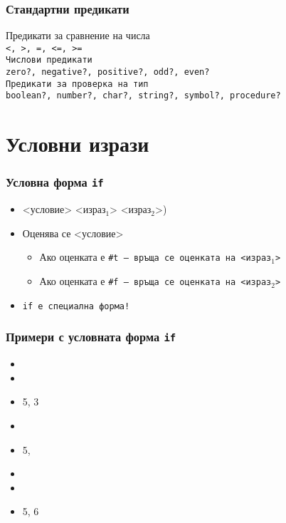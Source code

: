 \documentclass[alsotrans,beameroptions={aspectratio=169}]{beamerswitch}
\begin{document}
\begin{frame}
  \frametitle{Стандартни предикати}

  Предикати за сравнение на числа\\
  \tt{<}, \tt{>}, \tt{=}, \tt{<=}, \tt{>=}\\[1em]
  Числови предикати\\
  \tt{zero?}, \tt{negative?}, \tt{positive?}, \tt{odd?}, \tt{even?}\\[1em]
  Предикати за проверка на тип\\
  \tt{boolean?}, \tt{number?}, \tt{char?}, \tt{string?}, \tt{symbol?}, \tt{procedure?}
\end{frame}

\section{Условни изрази}

\begin{frame}
  \frametitle{Условна форма \tt{if}}

  \begin{itemize}[<+->]
  \item {} <условие> <израз$_1$> <израз$_2$>\tta)
  \item Оценява се <условие>
    \begin{itemize}
    \item Ако оценката е \tt{\#t} --- връща се оценката на <израз$_1$>
    \item Ако оценката е \tt{\#f} --- връща се оценката на <израз$_2$>
    \end{itemize}
  \item \alert{\tt{if} е специална форма!}
  \end{itemize}
\end{frame}

\begin{frame}
  \frametitle{Примери с условната форма \tt{if}}

  \begin{itemize}[<+->]
  \item {}
  \item {}
  \item {}5, 3
  \item {}
  \item {}5, 
  \item {}
  \item {}
  \item {}5, 6
  \end{itemize}
\end{frame}
\end{document}
